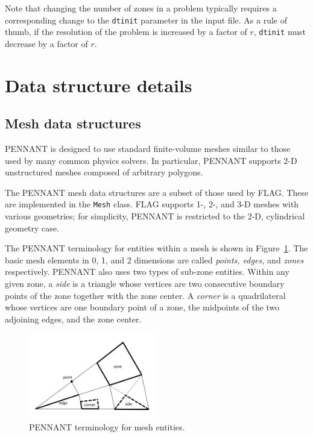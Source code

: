 \documentclass[11pt,letterpaper]{article} %
\begin{document}
Note that changing the number
of zones in a problem typically requires a corresponding change to the
{\tt dtinit} parameter in the input file.  As a rule of thumb, if the
resolution of the problem is increased by a factor of $r$, {\tt dtinit}
must decrease by a factor of $r$.

\section{Data structure details}

\subsection{Mesh data structures}

PENNANT is designed to use standard finite-volume meshes similar to
those used by many common physics solvers.  In particular, PENNANT
supports 2-D unstructured meshes composed of arbitrary polygons.

The PENNANT mesh data structures are a subset of those used by FLAG.
These are implemented in the {\tt Mesh} class.
FLAG supports 1-, 2-, and 3-D meshes with various geometries; for
simplicity, PENNANT is restricted to the 2-D, cylindrical geometry
case.

The PENNANT terminology for entities within a mesh is shown in
Figure~\ref{fig:mesh}.  The basic mesh elements in 0, 1, and 2 dimensions
are called {\em points, edges,} and {\em zones} respectively.
PENNANT also uses two types of sub-zone entities.  Within any given
zone, a {\em side} is a triangle whose vertices are two consecutive
boundary points of the zone together with the zone center.  A {\em corner}
is a quadrilateral whose vertices are one boundary point of a zone,
the midpoints of the two adjoining edges, and the zone center.

\begin{figure}
    \centering
    \includegraphics[width=0.50\textwidth]{mesh-entities.png}
    \caption{PENNANT terminology for mesh entities.}
    \label{fig:mesh}
\end{figure}
\end{document}
